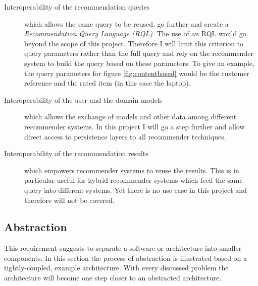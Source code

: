 \begin{description}
    \item[Interoperability of the recommendation queries] which allows the same query to be reused. \citet{adomavicius05} go further and create a \emph{Recommendation Query Language (RQL)}. The use of an RQL would go beyond the scope of this project. Therefore I will limit this criterion to query parameters rather than the full query and rely on the recommender system to build the query based on these parameters. To give an example, the query parameters for figure \ref{fig:contentbased} would be the customer reference and the rated item (in this case the laptop).
    \item[Interoperability of the user and the domain models] which allows the exchange of models and other data among different recommender systems. In this project I will go a step further and allow direct access to persistence layers to all recommender techniques.
    \item[Interoperability of the recommendation results] which empowers recommender systems to reuse the results. This is in particular useful for hybrid recommender systems which feed the same query into different systems. Yet there is no use case in this project and therefore will not be covered.
\end{description}

\subsection{Abstraction}
\label{problem-abstraction}

This requirement suggests to separate a software or architecture into smaller components. In this section the process of abstraction is illustrated based on a tightly-coupled, example architecture. With every discussed problem the architecture will become one step closer to an abstracted architecture. 

